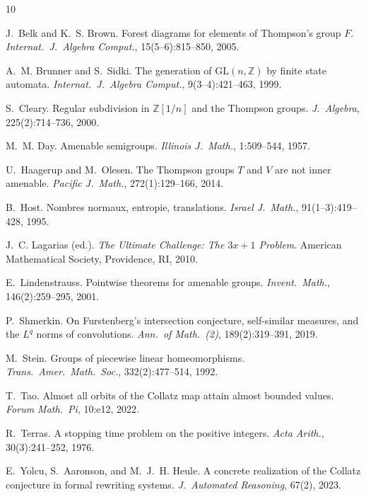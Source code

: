 \documentclass[12pt, a4paper]{amsart}
\theoremstyle{plain}
\theoremstyle{definition}
\theoremstyle{remark}
\begin{document}
\begin{thebibliography}{10}

J.~Belk and K.~S. Brown.
\newblock Forest diagrams for elements of Thompson's group $F$.
\newblock \emph{Internat.\ J.\ Algebra Comput.}, 15(5--6):815--850, 2005.

A.~M. Brunner and S.~Sidki.
\newblock The generation of $\mathrm{GL}(n,\mathbb{Z})$ by finite state
  automata.
\newblock \emph{Internat.\ J.\ Algebra Comput.}, 9(3--4):421--463, 1999.

S.~Cleary.
\newblock Regular subdivision in $\mathbb{Z}[1/n]$ and the Thompson groups.
\newblock \emph{J.\ Algebra}, 225(2):714--736, 2000.

M.~M. Day.
\newblock Amenable semigroups.
\newblock \emph{Illinois J.\ Math.}, 1:509--544, 1957.

U.~Haagerup and M.~Olesen.
\newblock The Thompson groups $T$ and $V$ are not inner amenable.
\newblock \emph{Pacific J.\ Math.}, 272(1):129--166, 2014.

B.~Host.
\newblock Nombres normaux, entropie, translations.
\newblock \emph{Israel J.\ Math.}, 91(1--3):419--428, 1995.

J.~C. Lagarias (ed.).
\newblock \emph{The Ultimate Challenge: The $3x+1$ Problem}.
\newblock American Mathematical Society, Providence, RI, 2010.

E.~Lindenstrauss.
\newblock Pointwise theorems for amenable groups.
\newblock \emph{Invent.\ Math.}, 146(2):259--295, 2001.

P.~Shmerkin.
\newblock On Furstenberg's intersection conjecture, self-similar measures,
  and the $L^q$ norms of convolutions.
\newblock \emph{Ann.\ of Math.\ (2)}, 189(2):319--391, 2019.

M.~Stein.
\newblock Groups of piecewise linear homeomorphisms.
\newblock \emph{Trans.\ Amer.\ Math.\ Soc.}, 332(2):477--514, 1992.

T.~Tao.
\newblock Almost all orbits of the Collatz map attain almost bounded values.
\newblock \emph{Forum Math.\ Pi}, 10:e12, 2022.

R.~Terras.
\newblock A stopping time problem on the positive integers.
\newblock \emph{Acta Arith.}, 30(3):241--252, 1976.

E.~Yolcu, S.~Aaronson, and M.~J.~H. Heule.
\newblock A concrete realization of the Collatz conjecture in formal rewriting
  systems.
\newblock \emph{J.\ Automated Reasoning}, 67(2), 2023.

\end{thebibliography}
\end{document}
